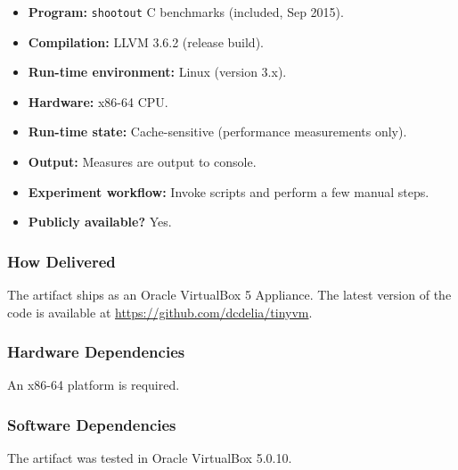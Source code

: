 {\small
\begin{itemize}[parsep=0pt]
  \item {\bf Program: } {\tt shootout} C benchmarks (included, Sep 2015). %
  \item {\bf Compilation: } LLVM 3.6.2 (release build).
  \item {\bf Run-time environment: } Linux (version 3.x).
  \item {\bf Hardware: } x86-64 CPU.
  \item {\bf Run-time state: } Cache-sensitive (performance measurements only).
  \item {\bf Output: } Measures are output to console.
  \item {\bf Experiment workflow: } Invoke scripts and perform a few manual steps.
  \item {\bf Publicly available?} Yes.
\end{itemize}
}

\subsubsection{How Delivered}

The artifact ships as an Oracle VirtualBox 5 Appliance.
The latest version of the code is available at \url{https://github.com/dcdelia/tinyvm}.

\subsubsection{Hardware Dependencies}

An x86-64 platform is required.

\subsubsection{Software Dependencies}

The artifact was tested in Oracle VirtualBox 5.0.10. 



